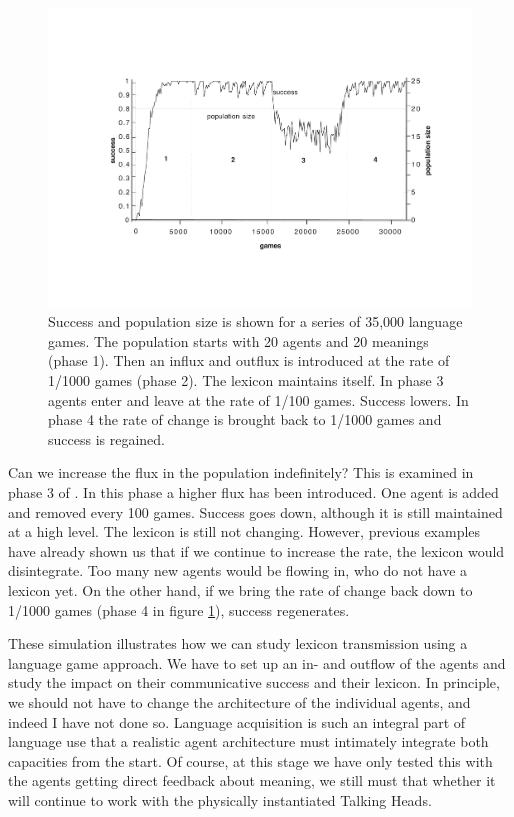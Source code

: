 \begin{figure}[htbp]
  \centerline{\includegraphics[width=.70\textwidth]{chap5/figs/birth+death}}
\caption{\footnotesize \label{birth+death} Success and population size 
is shown for a series of 35,000 language games. 
The population starts with 20 agents and 20 
meanings (phase 1). Then an influx and outflux is introduced 
at the rate of 1/1000 games (phase 2). The lexicon
maintains itself. In phase 3 agents enter and leave at
the rate of 1/100 games. Success lowers. In phase 
4 the rate of change is brought back to 1/1000 games
and success is regained.}
\end{figure}

Can we increase the flux in the population indefinitely? 
This is examined in phase 3 of . 
In this phase a higher flux has been introduced. One agent is added
and removed every 100 games. Success goes down, although it is still maintained at a high 
level. The lexicon is still not changing. 
However, previous examples have already shown us 
that if we continue to increase the rate, the
lexicon would disintegrate. 
Too many new agents would be flowing in, who do not have
a lexicon yet. On the other hand, if we bring the rate of change 
back down to 1/1000 games (phase 4 in figure 
\ref{birth+death}), success regenerates. 

These simulation illustrates how we can study lexicon
transmission using a language game approach. We have
to set up an in- and outflow of the agents and 
study the impact on their communicative success
and their lexicon. In principle, we should 
not have to change the architecture of the individual 
agents, and indeed I have not done so. Language acquisition 
is such an integral part of language use that a realistic 
agent architecture must intimately integrate both capacities
from the start. Of course, at this stage 
we have only tested this
with the agents getting direct feedback about meaning, 
we still must that whether it will continue to work
with the physically instantiated Talking Heads. 

